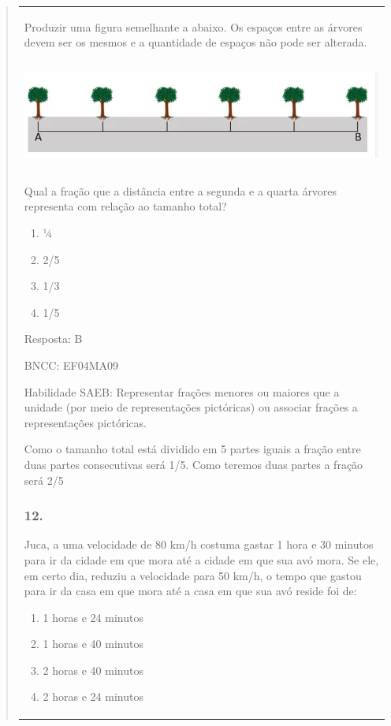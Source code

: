 \begin{enumerate}
\begin{escolha}
\begin{enumerate}
\begin{itemize}
\begin{itemize}
\begin{escolha}
\begin{quote}
\begin{escolha}
{\begin{longtable}[]{@{}l@{}}
\begin{itemize}
Produzir uma figura semelhante a abaixo. Os espaços entre as árvores
devem ser os mesmos e a quantidade de espaços não pode ser alterada.

\includegraphics[width=5.90556in,height=1.41944in]{media/image147.png}

Qual a fração que a distância entre a segunda e a quarta árvores
representa com relação ao tamanho total?

\begin{enumerate}
\def\labelenumi{\alph{enumi})}
\item
  ¼
\item
  2/5
\item
  1/3
\item
  1/5
\end{enumerate}

Resposta: B

BNCC: EF04MA09

Habilidade SAEB: Representar frações menores ou maiores que a unidade
(por meio de representações pictóricas) ou associar frações a
representações pictóricas.

Como o tamanho total está dividido em 5 partes iguais a fração entre
duas partes consecutivas será 1/5. Como teremos duas partes a fração
será 2/5

\subsubsection{12.}\label{section-153}

Juca, a uma velocidade de 80 km/h costuma gastar 1 hora e 30 minutos
para ir da cidade em que mora até a cidade em que sua avó mora. Se ele,
em certo dia, reduziu a velocidade para 50 km/h, o tempo que gastou para
ir da casa em que mora até a casa em que sua avó reside foi de:

\begin{enumerate}
\def\labelenumi{\alph{enumi})}
\item
  1 horas e 24 minutos
\item
  1 horas e 40 minutos
\item
  2 horas e 40 minutos
\item
  2 horas e 24 minutos
\end{enumerate}


\end{itemize}
\end{longtable}}
\end{escolha}
\end{quote}
\end{escolha}
\end{itemize}
\end{itemize}
\end{enumerate}
\end{escolha}
\end{enumerate}
